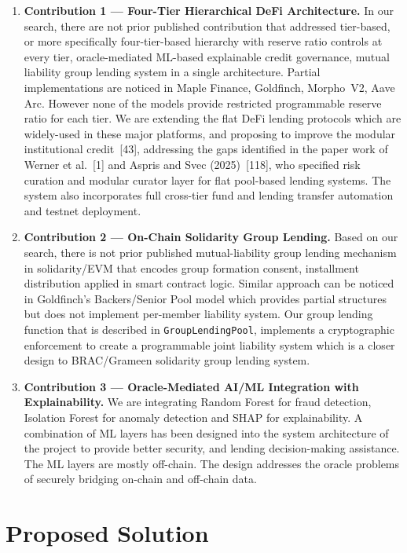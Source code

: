 \documentclass[12pt, a4paper]{report}
\begin{document}
\begin{enumerate}[noitemsep]
\item \textbf{Contribution 1 --- Four-Tier Hierarchical DeFi Architecture.}
In our search, there are not prior published contribution that addressed tier-based, or more specifically four-tier-based hierarchy with reserve ratio controls at every tier, oracle-mediated ML-based explainable credit governance, mutual liability group lending system in a single architecture. Partial implementations are noticed in Maple Finance, Goldfinch, Morpho~V2, Aave Arc. However none of the models provide restricted programmable reserve ratio for each tier. We are extending the flat DeFi lending protocols which are widely-used in these major platforms, and proposing to improve the modular institutional credit~[43], addressing the gaps identified in the paper work of Werner et al.~[1] and Aspris and Svec (2025)~[118], who specified risk curation and modular curator layer for flat pool-based lending systems. The system also incorporates full cross-tier fund and lending transfer automation and testnet deployment.

\item \textbf{Contribution 2 --- On-Chain Solidarity Group Lending.}
Based on our search, there is not prior published mutual-liability group lending mechanism in solidarity/EVM that encodes group formation consent, installment distribution applied in smart contract logic. Similar approach can be noticed in Goldfinch's Backers/Senior Pool model which provides partial structures but does not implement per-member liability system. Our group lending function that is described in \texttt{GroupLendingPool}, implements a cryptographic enforcement to create a programmable joint liability system which is a closer design to BRAC/Grameen solidarity group lending system.

\item \textbf{Contribution 3 --- Oracle-Mediated AI/ML Integration with Explainability.}
We are integrating Random Forest for fraud detection, Isolation Forest for anomaly detection and SHAP for explainability. A combination of ML layers has been designed into the system architecture of the project to provide better security, and lending decision-making assistance. The ML layers are mostly off-chain. The design addresses the oracle problems of securely bridging on-chain and off-chain data.
\end{enumerate}

\section{Proposed Solution}
\label{sec:proposed-solution}
\end{document}
